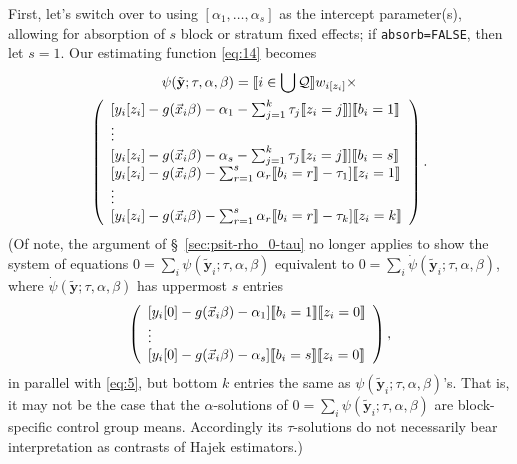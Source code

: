 \documentclass{article}
\DeclarePairedDelimiter{\indicator}{\llbracket}{\rrbracket}
\newcommand{\owt}[1][z_i]{\ensuremath{w_{i[#1]}}}
\begin{document}
First, let's switch over to using $[\alpha_{1}, \ldots, \alpha_{s}]$
as the intercept parameter(s), allowing for absorption of $s$ block or
stratum fixed effects; if \texttt{absorb=FALSE}, then let $s=1$.
Our estimating function \eqref{eq:14} becomes
\begin{multline}
  \label{eq:9}
  \psi(\tilde{\mathbf{y}}; \tau, \alpha, \beta) =
  \indicator{i \in \bigcup \mathcal{Q}} \owt{}\times \\  
  \left(
    \begin{array}{l}
           [y_{i}[z_{i}] - g(\vec{x}_{i}\beta)-
                  \alpha_{1} -
      \sum_{j=1}^{k}\tau_{j}\indicator{z_{i}=j}]\indicator{b_{i}=1}\\
      \vdots\\ 
          {} [y_{i}[z_{i}] - g(\vec{x}_{i}\beta)-
                  \alpha_{s} -
      \sum_{j=1}^{k}\tau_{j}\indicator{z_{i}=j}]\indicator{b_{i}=s}\\      
         {}  [y_{i}[z_{i}] - g(\vec{x}_{i}\beta)-
                  \sum_{r=1}^s\alpha_r\indicator{b_i=r}-\tau_{1}]\indicator{z_{i}=1}\\
                  \vdots \\
          {} [y_{i}[z_{i}] - g(\vec{x}_{i}\beta)-
                 \sum_{r=1}^s\alpha_r\indicator{b_i=r} - \tau_{k}]\indicator{z_{i}=k}\\
    \end{array}
\right).
\end{multline}
(Of note, the argument of \S~\ref{sec:psit-rho_0-tau} no longer applies
to show the system of equations
$0=\sum_{i}\psi(\tilde{\mathbf{y}}_{i}; \tau, \alpha, \beta)$
equivalent to $0=\sum_{i}\dot{\psi}(\tilde{\mathbf{y}}_{i}; \tau,
\alpha, \beta)$, where $\dot{\psi}(\tilde{\mathbf{y}}; \tau,
\alpha, \beta)$ has uppermost $s$ entries
\begin{equation*}
    \left(
    \begin{array}{l}
           [y_{i}[0] - g(\vec{x}_{i}\beta)-
                  \alpha_{1} ]\indicator{b_{i}=1} \indicator{z_{i}=0}\\
      \vdots\\ 
          {} [y_{i}[0] - g(\vec{x}_{i}\beta)-
                  \alpha_{s}]\indicator{b_{i}=s} \indicator{z_{i}=0}\\      
    \end{array}
    \right),
  \end{equation*}
in parallel with \eqref{eq:5}, but bottom $k$ entries the same as ${\psi}(\tilde{\mathbf{y}}_{i}; \tau,
\alpha, \beta)$'s. That is, it may not be the case that the $\alpha$-solutions of
$0=\sum_{i}\psi(\tilde{\mathbf{y}}_{i}; \tau, \alpha, \beta)$ are
block-specific control group means.  Accordingly its $\tau$-solutions
do not necessarily bear interpretation as contrasts of Hajek estimators.)
\end{document}
